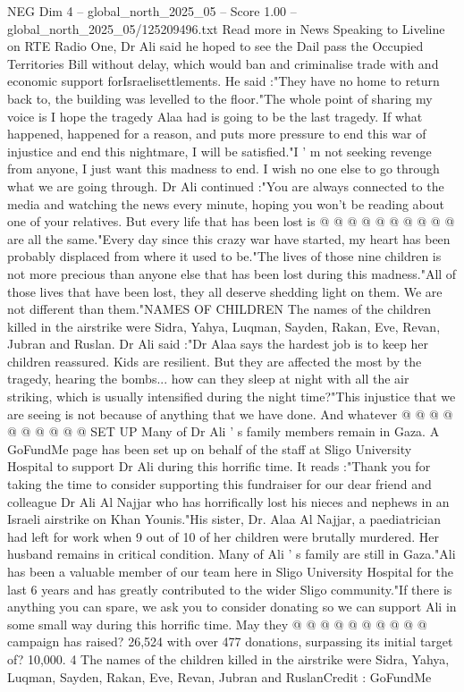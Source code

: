 \begin{textsample}{NEG Dim 4 – global\_north\_2025\_05 – Score 1.00 – global\_north\_2025\_05/125209496.txt}  \label{ex:f4_neg_268}
Read more in News Speaking to Liveline on RTE Radio One, Dr Ali said he hoped to see the Dail pass the Occupied Territories Bill without delay, which would ban and criminalise trade with and economic support forIsraelisettlements.
He said :"They have no home to return back to, the building was levelled to the floor."The whole point of sharing my voice is I hope the tragedy Alaa had is going to be the last tragedy.
If what happened, happened for a reason, and puts more pressure to end this war of injustice and end this nightmare, I will be satisfied."I ' m not seeking revenge from anyone, I just want this madness to end.
I wish no one else to go through what we are going through.
Dr Ali continued :"You are always connected to the media and watching the news every minute, hoping you won't be reading about one of your relatives.
But every life that has been lost is @ @ @ @ @ @ @ @ @ @ are all the same."Every day since this crazy war have started, my heart has been probably displaced from where it used to be."The lives of those nine children is not more precious than anyone else that has been lost during this madness."All of those lives that have been lost, they all deserve shedding light on them.
We are not different than them."NAMES OF CHILDREN The names of the children killed in the airstrike were Sidra, Yahya, Luqman, Sayden, Rakan, Eve, Revan, Jubran and Ruslan.
Dr Ali said :"Dr Alaa says the hardest job is to keep her children reassured.
Kids are resilient.
But they are affected the most by the tragedy, hearing the bombs... how can they sleep at night with all the air striking, which is usually intensified during the night time?"This injustice that we are seeing is not because of anything that we have done.
And whatever @ @ @ @ @ @ @ @ @ @ SET UP Many of Dr Ali ' s family members remain in Gaza.
A GoFundMe page has been set up on behalf of the staff at Sligo University Hospital to support Dr Ali during this horrific time.
It reads :"Thank you for taking the time to consider supporting this fundraiser for our dear friend and colleague Dr Ali Al Najjar who has horrifically lost his nieces and nephews in an Israeli airstrike on Khan Younis."His sister, Dr.
Alaa Al Najjar, a paediatrician had left for work when 9 out of 10 of her children were brutally murdered.
Her husband remains in critical condition.
Many of Ali ' s family are still in Gaza."Ali has been a valuable member of our team here in Sligo University Hospital for the last 6 years and has greatly contributed to the wider Sligo community."If there is anything you can spare, we ask you to consider donating so we can support Ali in some small way during this horrific time.
May they @ @ @ @ @ @ @ @ @ @ campaign has raised? 26,524 with over 477 donations, surpassing its initial target of? 10,000. 4 The names of the children killed in the airstrike were Sidra, Yahya, Luqman, Sayden, Rakan, Eve, Revan, Jubran and RuslanCredit : GoFundMe

\end{textsample}
